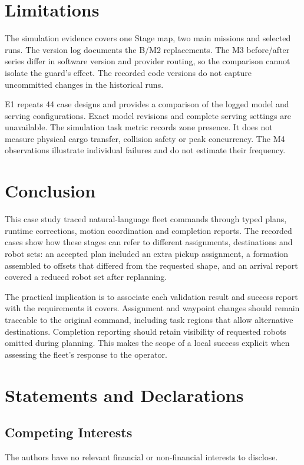 \documentclass[pdflatex,sn-mathphys-num]{sn-jnl}
\begin{document}
\section{Limitations}
\label{sec:limitations}

The simulation evidence covers one Stage map, two main missions and
selected runs. The version log documents the B/M2 replacements. The M3
before/after series differ in software version and provider routing, so
the comparison cannot isolate the guard's effect. The recorded code
versions do not capture uncommitted changes in the historical runs.

E1 repeats 44 case designs and provides a comparison of the logged model
and serving configurations. Exact model revisions and complete serving
settings are unavailable. The simulation task metric records zone
presence. It does not measure physical cargo transfer, collision safety
or peak concurrency. The M4 observations illustrate individual failures
and do not estimate their frequency.

\section{Conclusion}

This case study traced natural-language fleet commands through typed plans,
runtime corrections, motion coordination and completion reports. The recorded
cases show how these stages can refer to different assignments, destinations and
robot sets: an accepted plan included an extra pickup assignment, a formation
assembled to offsets that differed from the requested shape, and an arrival
report covered a reduced robot set after replanning.

The practical implication is to associate each validation result and success
report with the requirements it covers. Assignment and waypoint changes should
remain traceable to the original command, including task regions that allow
alternative destinations. Completion reporting should retain visibility of
requested robots omitted during planning. This makes the scope of a local
success explicit when assessing the fleet's response to the operator.

\backmatter

\section*{Statements and Declarations}

\subsection*{Competing Interests}
The authors have no relevant financial or non-financial interests to disclose.
\end{document}
